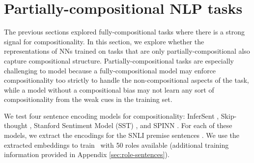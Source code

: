 \section{Partially-compositional NLP tasks} \label{sec:NLP}
The previous sections explored fully-compositional tasks where there is a strong signal for compositionality. In this section, we explore whether the representations of NNs trained on tasks that are only partially-compositional also capture compositional structure. Partially-compositional tasks are especially challenging to model because a fully-compositional model may enforce compositionality too strictly to handle the non-compositional aspects of the task, while a model without a compositional bias may not learn any sort of compositionality from the weak cues in the training set.

We test four sentence encoding models for compositionality: InferSent \citep{conneau2017supervised}, Skip-thought \citep{kiros2015skip}, Stanford Sentiment Model (SST) \citep{socher2013recursive}, and SPINN \citep{bowman2016fast}. For each of these models, we extract the encodings for the SNLI premise sentences \citep{bowman2015large}. We use the extracted embeddings to train \RLN\ with 50 roles available (additional training information provided in Appendix \ref{sec:role-sentences}).

\begin{table}[h!]
    \centering
    \caption{\label{tab:sent-emb-mse}MSE loss for learned (bold) and hand-crafted role schemes on sentence embedding models. (Sec.~\ref{sec:NLP})}

\end{table}

